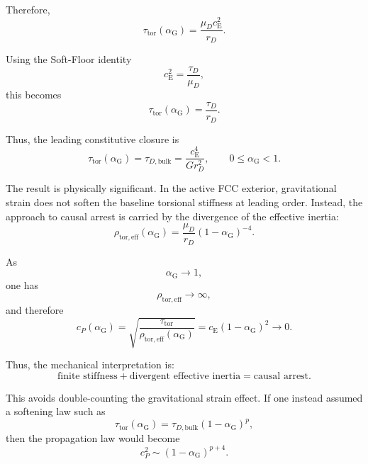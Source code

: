 Therefore,
\begin{equation}
    \tau_{\mathrm{tor}}(\alpha_{\mathrm{G}}) = \frac{\mu_D c_{\mathrm{E}}^2}{r_D}.
\end{equation}

Using the Soft-Floor identity
\begin{equation}
    c_{\mathrm{E}}^2 = \frac{\tau_D}{\mu_D},
\end{equation}
this becomes
\begin{equation}
    \tau_{\mathrm{tor}}(\alpha_{\mathrm{G}}) = \frac{\tau_D}{r_D}.
\end{equation}

Thus, the leading constitutive closure is
\begin{equation}
    \boxed{ \tau_{\mathrm{tor}}(\alpha_{\mathrm{G}}) = \tau_{D,\mathrm{bulk}} = \frac{c_{\mathrm{E}}^4}{G r_D^2}, \qquad 0 \leq \alpha_{\mathrm{G}} < 1. }
\end{equation}

The result is physically significant. In the active FCC exterior, gravitational strain does not soften the baseline torsional stiffness at leading order. Instead, the approach to causal arrest is carried by the divergence of the effective inertia:
\begin{equation}
    \rho_{\mathrm{tor,eff}}(\alpha_{\mathrm{G}}) = \frac{\mu_D}{r_D}(1-\alpha_{\mathrm{G}})^{-4}.
\end{equation}

As
\begin{equation}
    \alpha_{\mathrm{G}} \rightarrow 1,
\end{equation}
one has
\begin{equation}
    \rho_{\mathrm{tor,eff}} \rightarrow \infty,
\end{equation}
and therefore
\begin{equation}
    c_P(\alpha_{\mathrm{G}}) = \sqrt{ \frac{\tau_{\mathrm{tor}}}{\rho_{\mathrm{tor,eff}}(\alpha_{\mathrm{G}})} } = c_{\mathrm{E}}(1-\alpha_{\mathrm{G}})^2 \rightarrow 0.
\end{equation}

Thus, the mechanical interpretation is:
\begin{equation}
    \boxed{ \text{finite stiffness} + \text{divergent effective inertia} = \text{causal arrest}. }
\end{equation}

This avoids double-counting the gravitational strain effect. If one instead assumed a softening law such as
\begin{equation}
    \tau_{\mathrm{tor}}(\alpha_{\mathrm{G}}) = \tau_{D,\mathrm{bulk}}(1-\alpha_{\mathrm{G}})^p,
\end{equation}
then the propagation law would become
\begin{equation}
    c_P^2 \sim (1-\alpha_{\mathrm{G}})^{p+4}.
\end{equation}

